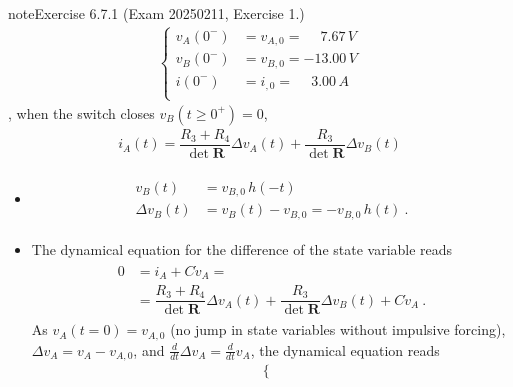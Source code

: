 \documentclass[letterpaper,10pt,english]{jupyterBook}
\begin{document}
\begin{sphinxadmonition}{note}{Exercise 6.7.1 (Exam 2025\sphinxhyphen{}02\sphinxhyphen{}11, Exercise 1.)}
\begin{equation*}
\begin{split}\begin{cases}
  v_A(0^-) & = v_{A,0} = \quad\ 7.67 \, V \\
  v_B(0^-) & = v_{B,0} =      -13.00 \, V \\
    i(0^-) & = i_{ ,0} = \quad\ 3.00 \, A \\
\end{cases}\end{split}
\end{equation*}
\sphinxAtStartPar
{}, when the switch closes \(v_B(t \ge 0^+) = 0\),
\begin{equation*}
\begin{split}i_A(t) = \dfrac{R_3 + R_4}{\det \mathbf{R}} \Delta v_A(t) + \dfrac{R_3}{\det \mathbf{R}} \Delta v_B(t)\end{split}
\end{equation*}\begin{itemize}
\item {} 
\sphinxAtStartPar
{}
\begin{equation*}
\begin{split}\begin{aligned}
     v_{B}(t) & = v_{B,0} \, h(-t) \\
     \Delta v_{B}(t) & = v_B(t) - v_{B,0} = - v_{B,0} \, h(t) \ . 
   \end{aligned}\end{split}
\end{equation*}
\item {} 
\sphinxAtStartPar
{} The dynamical equation for the difference of the state variable reads
\begin{equation*}
\begin{split}\begin{aligned}
     0 & = i_A + C \dot{v}_A = \\
       & = \dfrac{R_3 + R_4}{\det \mathbf{R}} \Delta v_A(t) + \dfrac{R_3}{\det \mathbf{R}} \Delta v_B(t) + C \dot{v}_A \ .
   \end{aligned}\end{split}
\end{equation*}
\sphinxAtStartPar
As \(v_{A}(t=0) = v_{A,0}\) (no jump in state variables without impulsive forcing), \(\Delta v_A = v_A - v_{A,0}\), and \(\frac{d}{dt} \Delta v_A = \frac{d}{dt} v_A\), the dynamical equation reads
\begin{equation*}
\begin{split}\begin{cases}

\end{cases}
\end{split}
\end{equation*}
\end{itemize}
\end{sphinxadmonition}
\end{document}
